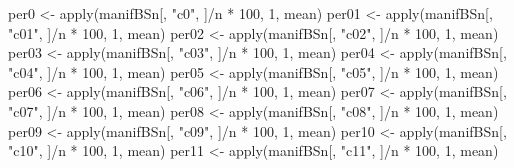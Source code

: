 \documentclass[
]{article}
\newenvironment{Shaded}{\begin{snugshade}}{\end{snugshade}}
\newcommand{\DecValTok}[1]{\textcolor[rgb]{0.00,0.00,0.81}{#1}}
\newcommand{\FunctionTok}[1]{\textcolor[rgb]{0.00,0.00,0.00}{#1}}
\newcommand{\NormalTok}[1]{#1}
\newcommand{\OtherTok}[1]{\textcolor[rgb]{0.56,0.35,0.01}{#1}}
\newcommand{\SpecialCharTok}[1]{\textcolor[rgb]{0.00,0.00,0.00}{#1}}
\newcommand{\StringTok}[1]{\textcolor[rgb]{0.31,0.60,0.02}{#1}}
\begin{document}
\begin{Shaded}
\begin{Highlighting}[]
\NormalTok{per0 }\OtherTok{\textless{}{-}} \FunctionTok{apply}\NormalTok{(manifBSn[, }\StringTok{"c0"}\NormalTok{, ]}\SpecialCharTok{/}\NormalTok{n }\SpecialCharTok{*} \DecValTok{100}\NormalTok{, }\DecValTok{1}\NormalTok{, mean)}
\NormalTok{per01 }\OtherTok{\textless{}{-}} \FunctionTok{apply}\NormalTok{(manifBSn[, }\StringTok{"c01"}\NormalTok{, ]}\SpecialCharTok{/}\NormalTok{n }\SpecialCharTok{*} \DecValTok{100}\NormalTok{, }\DecValTok{1}\NormalTok{, mean)}
\NormalTok{per02 }\OtherTok{\textless{}{-}} \FunctionTok{apply}\NormalTok{(manifBSn[, }\StringTok{"c02"}\NormalTok{, ]}\SpecialCharTok{/}\NormalTok{n }\SpecialCharTok{*} \DecValTok{100}\NormalTok{, }\DecValTok{1}\NormalTok{, mean)}
\NormalTok{per03 }\OtherTok{\textless{}{-}} \FunctionTok{apply}\NormalTok{(manifBSn[, }\StringTok{"c03"}\NormalTok{, ]}\SpecialCharTok{/}\NormalTok{n }\SpecialCharTok{*} \DecValTok{100}\NormalTok{, }\DecValTok{1}\NormalTok{, mean)}
\NormalTok{per04 }\OtherTok{\textless{}{-}} \FunctionTok{apply}\NormalTok{(manifBSn[, }\StringTok{"c04"}\NormalTok{, ]}\SpecialCharTok{/}\NormalTok{n }\SpecialCharTok{*} \DecValTok{100}\NormalTok{, }\DecValTok{1}\NormalTok{, mean)}
\NormalTok{per05 }\OtherTok{\textless{}{-}} \FunctionTok{apply}\NormalTok{(manifBSn[, }\StringTok{"c05"}\NormalTok{, ]}\SpecialCharTok{/}\NormalTok{n }\SpecialCharTok{*} \DecValTok{100}\NormalTok{, }\DecValTok{1}\NormalTok{, mean)}
\NormalTok{per06 }\OtherTok{\textless{}{-}} \FunctionTok{apply}\NormalTok{(manifBSn[, }\StringTok{"c06"}\NormalTok{, ]}\SpecialCharTok{/}\NormalTok{n }\SpecialCharTok{*} \DecValTok{100}\NormalTok{, }\DecValTok{1}\NormalTok{, mean)}
\NormalTok{per07 }\OtherTok{\textless{}{-}} \FunctionTok{apply}\NormalTok{(manifBSn[, }\StringTok{"c07"}\NormalTok{, ]}\SpecialCharTok{/}\NormalTok{n }\SpecialCharTok{*} \DecValTok{100}\NormalTok{, }\DecValTok{1}\NormalTok{, mean)}
\NormalTok{per08 }\OtherTok{\textless{}{-}} \FunctionTok{apply}\NormalTok{(manifBSn[, }\StringTok{"c08"}\NormalTok{, ]}\SpecialCharTok{/}\NormalTok{n }\SpecialCharTok{*} \DecValTok{100}\NormalTok{, }\DecValTok{1}\NormalTok{, mean)}
\NormalTok{per09 }\OtherTok{\textless{}{-}} \FunctionTok{apply}\NormalTok{(manifBSn[, }\StringTok{"c09"}\NormalTok{, ]}\SpecialCharTok{/}\NormalTok{n }\SpecialCharTok{*} \DecValTok{100}\NormalTok{, }\DecValTok{1}\NormalTok{, mean)}
\NormalTok{per10 }\OtherTok{\textless{}{-}} \FunctionTok{apply}\NormalTok{(manifBSn[, }\StringTok{"c10"}\NormalTok{, ]}\SpecialCharTok{/}\NormalTok{n }\SpecialCharTok{*} \DecValTok{100}\NormalTok{, }\DecValTok{1}\NormalTok{, mean)}
\NormalTok{per11 }\OtherTok{\textless{}{-}} \FunctionTok{apply}\NormalTok{(manifBSn[, }\StringTok{"c11"}\NormalTok{, ]}\SpecialCharTok{/}\NormalTok{n }\SpecialCharTok{*} \DecValTok{100}\NormalTok{, }\DecValTok{1}\NormalTok{, mean)}

\end{Highlighting}
\end{Shaded}
\end{document}
